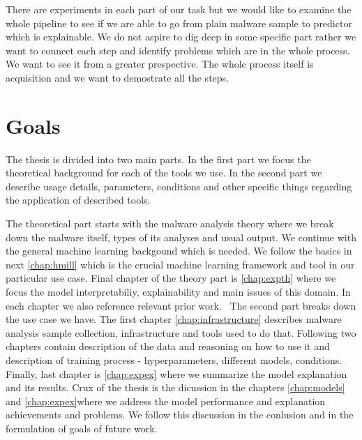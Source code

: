 There are experiments in each part of our task but we would like to examine the whole pipeline to see if we are able to go from plain malware sample to predictor which is explainable. We do not aspire to dig deep in some specific part rather we want to connect each step and identify problems which are in the whole process. We want to see it from a greater prespective. The whole process itself is acquisition and we want to demostrate all the steps.
\section{Goals}

The thesis is divided into two main parts. In the first part we focus the theoretical background for each of the tools we use. In the second part we describe usage details, parameters, conditions and other specific things regarding the application of described tools.

The theoretical part starts with the malware analysis theory where we break down the malware itself, types of its analyses and usual output. We continue with the general machine learning backgound which is needed. We follow the basics in next \ref{chap:hmill} which is the crucial machine learning framework and tool in our particular use case. Final chapter of the theory part is \ref{chap:expth} where we focus the model interpretabiliy, explainability and main issues of this domain. In each chapter we also reference relevant prior work.
\
The second part breaks down the use case we have. The first chapter \ref{chap:infrastructure} describes malware analysis sample collection, infrastructure and tools used to do that. Following two chapters contain description of the data and reasoning on how to use it and description of training process - hyperparameters, different models, conditions. Finally, last chapter is \ref{chap:expex} where we summarize the model explanation and its results. Crux of the thesis is the dicussion in the chapters \ref{chap:models} and \ref{chap:expex}where we address the model performance and explanation achievements and problems. We follow this discussion in the conlusion and in the formulation of goals of future work.




